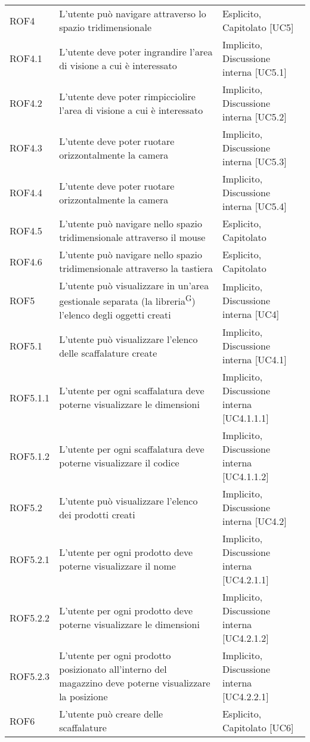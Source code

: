 \begin{xltabular}{\textwidth}{ p{0.1\textwidth} | X | p{0.3\textwidth} }
    ROF4 & L'utente può navigare attraverso lo spazio tridimensionale & Esplicito, Capitolato [UC5]\\
    ROF4.1 & L'utente deve poter ingrandire l'area di visione a cui è interessato & Implicito, Discussione interna [UC5.1] \\
    ROF4.2 & L'utente deve poter rimpicciolire l'area di visione a cui è interessato & Implicito, Discussione interna [UC5.2] \\
    ROF4.3 & L'utente deve poter ruotare orizzontalmente la camera & Implicito, Discussione interna [UC5.3] \\
    ROF4.4 & L'utente deve poter ruotare orizzontalmente la camera & Implicito, Discussione interna [UC5.4] \\
    ROF4.5 & L'utente può navigare nello spazio tridimensionale attraverso il mouse& Esplicito, Capitolato\\
    ROF4.6 & L'utente può navigare nello spazio tridimensionale attraverso la tastiera& Esplicito, Capitolato\\
    ROF5 & L'utente può visualizzare in un'area gestionale separata (la libreria\textsuperscript{G}) l'elenco degli oggetti creati & Implicito, Discussione interna [UC4] \\
    ROF5.1 & L'utente può visualizzare l'elenco delle scaffalature create & Implicito, Discussione interna [UC4.1] \\
    ROF5.1.1 & L'utente per ogni scaffalatura deve poterne visualizzare le dimensioni & Implicito, Discussione interna [UC4.1.1.1]\\
    ROF5.1.2 & L'utente per ogni scaffalatura deve poterne visualizzare il codice & Implicito, Discussione interna [UC4.1.1.2]\\
    ROF5.2 & L'utente può visualizzare l'elenco dei prodotti creati & Implicito, Discussione interna [UC4.2] \\
    ROF5.2.1 & L'utente per ogni prodotto deve poterne visualizzare il nome & Implicito, Discussione interna [UC4.2.1.1]\\
    ROF5.2.2 & L'utente per ogni prodotto deve poterne visualizzare le dimensioni & Implicito, Discussione interna [UC4.2.1.2]\\
    ROF5.2.3 & L'utente per ogni prodotto posizionato all'interno del magazzino deve poterne visualizzare la posizione & Implicito, Discussione interna [UC4.2.2.1] \\
    ROF6 & L'utente può creare delle scaffalature & Esplicito, Capitolato [UC6]\\

\end{xltabular}

